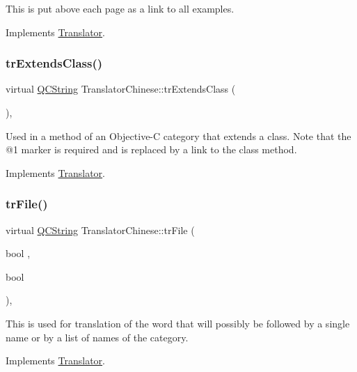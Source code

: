 This is put above each page as a link to all examples. 

Implements \mbox{\hyperlink{class_translator}{Translator}}.

\mbox{\label{class_translator_chinese_a6d67b6a3dc10862a8a5af714354a9bcc}} 
\subsubsection{\texorpdfstring{trExtendsClass()}{trExtendsClass()}}
{\footnotesize\ttfamily virtual \mbox{\hyperlink{class_q_c_string}{Q\+C\+String}} Translator\+Chinese\+::tr\+Extends\+Class (\begin{DoxyParamCaption}{ }\end{DoxyParamCaption})\hspace{0.3cm}{\ttfamily [inline]}, {\ttfamily [virtual]}}

Used in a method of an Objective-\/C category that extends a class. Note that the @1 marker is required and is replaced by a link to the class method. 

Implements \mbox{\hyperlink{class_translator}{Translator}}.

\mbox{\label{class_translator_chinese_aec3c0a7ad2bfc26114a576fd42c88435}} 
\subsubsection{\texorpdfstring{trFile()}{trFile()}}
{\footnotesize\ttfamily virtual \mbox{\hyperlink{class_q_c_string}{Q\+C\+String}} Translator\+Chinese\+::tr\+File (\begin{DoxyParamCaption}\item[{bool}]{,  }\item[{bool}]{ }\end{DoxyParamCaption})\hspace{0.3cm}{\ttfamily [inline]}, {\ttfamily [virtual]}}

This is used for translation of the word that will possibly be followed by a single name or by a list of names of the category. 

Implements \mbox{\hyperlink{class_translator}{Translator}}.

